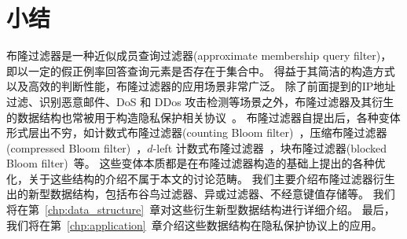 \section{小结}

布隆过滤器是一种近似成员查询过滤器(approximate membership query filter)，即以一定的假正例率回答查询元素是否存在于集合中。
得益于其简洁的构造方式以及高效的判断性能，布隆过滤器的应用场景非常广泛。
除了前面提到的IP地址过滤、识别恶意邮件、DoS 和 DDos 攻击检测等场景之外，布隆过滤器及其衍生的数据结构也常被用于构造隐私保护相关协议~\cite{zhang2024survey}。
布隆过滤器自提出后，各种变体形式层出不穷，如计数式布隆过滤器(counting Bloom filter)~\cite{lifan2000summary}，压缩布隆过滤器(compressed Bloom filter)~\cite{mitzenmacher2002compressed}，$d$-left 计数式布隆过滤器~\cite{bonomi2006improved}，块布隆过滤器(blocked Bloom filter)~\cite{putze2009cache}等。
这些变体本质都是在布隆过滤器构造的基础上提出的各种优化，关于这些结构的介绍不属于本文的讨论范畴。
我们主要介绍布隆过滤器衍生出的新型数据结构，包括布谷鸟过滤器、异或过滤器、不经意键值存储等。
我们将在第~\ref{chp:data_structure}~章对这些衍生新型数据结构进行详细介绍。
最后，我们将在第~\ref{chp:application}~章介绍这些数据结构在隐私保护协议上的应用。
